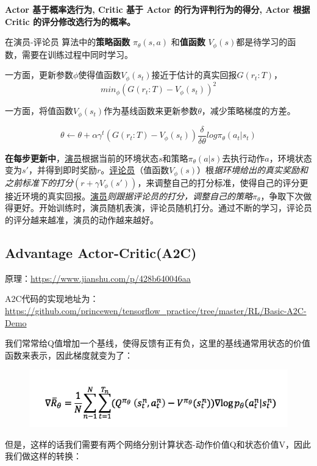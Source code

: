 \documentclass[UTF8,a4paper,12pt]{ctexbook}
\begin{document}
			\textbf{Actor 基于概率选行为, Critic 基于 Actor 的行为评判行为的得分, Actor 根据 Critic 的评分修改选行为的概率。}
				
			在演员-评论员 算法中的\textbf{策略函数} $\pi_\theta (s, a)$ 和\textbf{值函数} $V_\phi(s) $都是待学习的函数，需要在训练过程中同时学习。	
				
			一方面，更新参数$\phi$使得值函数$V_\phi(s_t)$接近于估计的真实回报$G(r_t:T)$，
				$$
					min_\phi \left( G(r_t:T) - V_\phi(s_t)\right)^2
				$$
				
			一方面，将值函数$V_\phi(s_t)$作为基线函数来更新参数$\theta$，减少策略梯度的方差。
				
				$$ \theta \gets \theta + \alpha\gamma^t\left(G(r_t:T) - V_\phi(s_t)\right) \dfrac{\delta}{\delta\theta}log\pi_\theta(a_t|s_t)$$
		
			\textbf{在每步更新中}，\underline{演员}根据当前的环境状态$s$和策略$\pi_\theta(a|s)$去执行动作$a$，环境状态变为$s′$，并得到即时奖励$r$。\underline{评论员}（值函数$V_\phi(s)$）根\textit{据环境给出的真实奖励和之前标准下的打分}$(r + \gamma V_\phi(s'))$，来调整自己的打分标准，使得自己的评分更接近环境的真实回报。\underline{演员}\textit{则跟据评论员的打分，调整自己的策略}$\pi_\theta$，争取下次做得更好。开始训练时，演员随机表演，评论员随机打分。通过不断的学习，评论员的评分越来越准，演员的动作越来越好。
	
		\subsection{Advantage Actor-Critic(A2C)}
			原理：\url{https://www.jianshu.com/p/428b640046aa}	
			
			A2C代码的实现地址为：\url{https://github.com/princewen/tensorflow_practice/tree/master/RL/Basic-A2C-Demo}
		
			我们常常给Q值增加一个基线，使得反馈有正有负，这里的基线通常用状态的价值函数来表示，因此梯度就变为了：
			
			\begin{figure}[H]
			\centering
			\includegraphics[width=.9\linewidth]{PG08}
			\end{figure}				
			但是，这样的话我们需要有两个网络分别计算状态-动作价值Q和状态价值V，因此我们做这样的转换：
			
\end{document}
